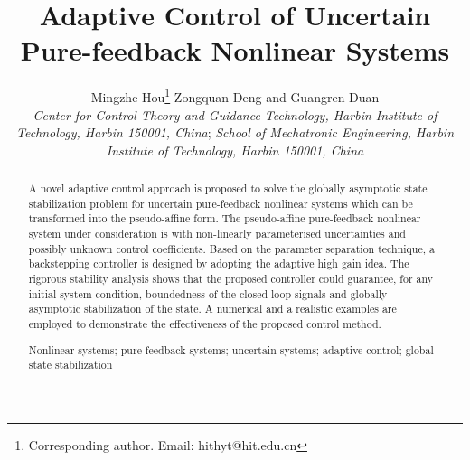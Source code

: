 \documentclass{tSYS2e}
\theoremstyle{plain}
\theoremstyle{definition}
\begin{document}
\title{Adaptive Control of Uncertain Pure-feedback Nonlinear Systems}

\author{Mingzhe Hou\thanks{Corresponding author. Email: hithyt@hit.edu.cn
\vspace{6pt}} Zongquan Deng and Guangren Duan \\\vspace{6pt} {\em{Center for Control Theory and Guidance Technology, Harbin
Institute of Technology, Harbin 150001, China}};
{\em{School of Mechatronic Engineering, Harbin
Institute of Technology, Harbin 150001, China}}\\ }

\maketitle

\begin{abstract}
A novel adaptive control approach is proposed to solve the globally asymptotic state stabilization problem
for uncertain pure-feedback nonlinear systems which can be transformed into the pseudo-affine form.
The pseudo-affine pure-feedback nonlinear system under consideration is with non-linearly parameterised uncertainties
and possibly unknown control coefficients. Based on the parameter separation technique, a backstepping controller is designed by adopting the adaptive high gain idea. The rigorous stability analysis shows that the proposed controller could guarantee, for any initial system condition,
boundedness of the closed-loop signals and globally asymptotic stabilization of the state.
A numerical and a realistic examples are employed to demonstrate the effectiveness of the proposed control method.

\begin{keywords}Nonlinear systems; pure-feedback systems; uncertain
systems; adaptive control; global state stabilization
\end{keywords}

\end{abstract}
\end{document}

